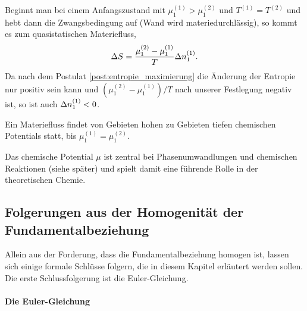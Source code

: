 Beginnt man bei einem Anfangszustand mit $\mu_1^{(1)} > \mu_1^{(2)}$ und $T^{(1)} = T^{(2)}$ und hebt dann die Zwangsbedingung auf (Wand wird materiedurchlässig), so kommt es zum quasistatischen Materiefluss,
\begin{align*}
    \Delta S = \frac{\mu_1^{(2)} - \mu_1^{(1)}}{T} \Delta n_1^{(1)}.
\end{align*}
Da nach dem Postulat \ref{post:entropie_maximierung} die Änderung der Entropie nur positiv sein kann und $(\mu_1^{(2)} - \mu_1^{(1)})/T$ nach unserer Festlegung negativ ist, so ist auch $\Delta n_1^{(1)}<0$.

\begin{formal}
    Ein Materiefluss findet von Gebieten hohen zu Gebieten tiefen chemischen Potentials statt, bis $\mu_1^{(1)} = \mu_1^{(2)}$.
\end{formal}

Das chemische Potential $\mu$ ist zentral bei Phasenumwandlungen und chemischen Reaktionen (siehe später) und spielt damit eine führende Rolle in der theoretischen Chemie.



\subsection{Folgerungen aus der Homogenität der Fundamentalbeziehung}

Allein aus der Forderung, dass die Fundamentalbeziehung homogen ist, lassen sich einige formale Schlüsse folgern, die in diesem Kapitel erläutert werden sollen. Die erste Schlussfolgerung ist die Euler-Gleichung.

\paragraph*{Die Euler-Gleichung}

